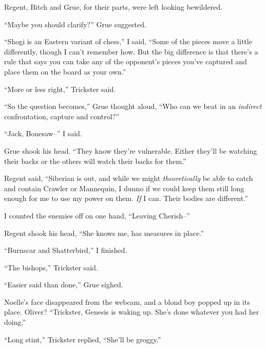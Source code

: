 Regent, Bitch and Grue, for their parts, were left looking bewildered.



``Maybe you should clarify?'' Grue suggested.



``Shogi is an Eastern variant of chess,'' I said, ``Some of the pieces move a little differently, though I can't remember how.  But the big difference is that there's a rule that says you can take any of the opponent's pieces you've captured and place them on the board as your own.''



``More or less right,'' Trickster said.



``So the question becomes,'' Grue thought aloud, ``Who can we beat in an \emph{indirect} confrontation, capture and control?''



``Jack, Bonesaw--'' I said.



Grue shook his head.  ``They know they're vulnerable.  Either they'll be watching their backs or the others will watch their backs for them.''



Regent said, ``Siberian is out, and while we might \emph{theoretically} be able to catch and contain Crawler or Mannequin, I dunno if we could keep them still long enough for me to use my power on them.  \emph{If} I can.  Their bodies are different.''



I counted the enemies off on one hand, ``Leaving Cherish--''



Regent shook his head, ``She knows me, has measures in place.''



``Burnscar and Shatterbird,'' I finished.



``The bishops,'' Trickster said.



``Easier said than done,'' Grue sighed.



Noelle's face disappeared from the webcam, and a blond boy popped up in its place.  Oliver?  ``Trickster, Genesis is waking up.  She's done whatever you had her doing.''



``Long stint,'' Trickster replied, ``She'll be groggy.''



